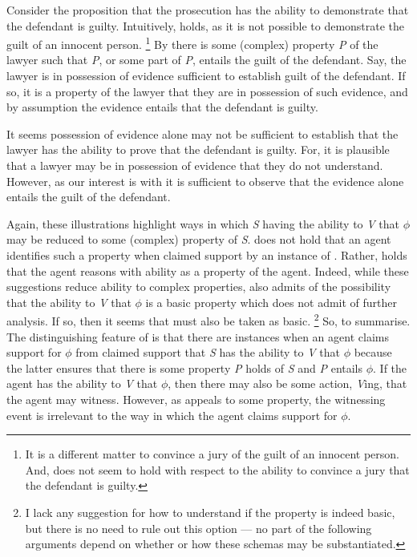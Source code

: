 \begin{note}
  \begin{illustration}
    Consider the proposition that the prosecution has the ability to demonstrate that the defendant is guilty.
    Intuitively,  holds, as it is not possible to demonstrate the guilt of an innocent person.\nolinebreak
    \footnote{
      It is a different matter to convince a jury of the guilt of an innocent person.
      And,  does not seem to hold with respect to the ability to convince a jury that the defendant is guilty.
    }
    By \AR{} there is some (complex) property \emph{P} of the lawyer such that \emph{P}, or some part of \emph{P}, entails the guilt of the defendant.
    Say, the lawyer is in possession of evidence sufficient to establish guilt of the defendant.
    If so, it is a property of the lawyer that they are in possession of such evidence, and by assumption the evidence entails that the defendant is guilty.

    It seems possession of evidence alone may not be sufficient to establish that the lawyer has the ability to prove that the defendant is guilty.
    For, it is plausible that a lawyer may be in possession of evidence that they do not understand.
    However, as our interest is with  it is sufficient to observe that the evidence alone entails the guilt of the defendant.
  \end{illustration}

  Again, these illustrations highlight ways in which \emph{S} having the ability to \emph{V} that \(\phi\) may be reduced to some (complex) property of \emph{S}.
  \AR{} does not hold that an agent identifies such a property when claimed support by an instance of .
  Rather, \AR{} holds that the agent reasons with ability as a property of the agent.
  Indeed, while these suggestions reduce ability to complex properties, \AR{} also admits of the possibility that the ability to \emph{V} that \(\phi\) is a basic property which does not admit of further analysis.
  If so, then it seems that  must also be taken as basic.\nolinebreak
  \footnote{
    I lack any suggestion for how to understand \AR{} if the property is indeed basic, but there is no need to rule out this option ---  no part of the following arguments depend on whether or how these schemas may be substantiated.
  }
  So, to summarise.
  The distinguishing feature of \AR{} is that there are instances when an agent claims support for \(\phi\) from claimed support that \emph{S} has the ability to \emph{V} that \(\phi\) because the latter ensures that there is some property \emph{P} holds of \emph{S} and \emph{P} entails \(\phi\).
  If the agent has the ability to \emph{V} that \(\phi\), then there may also be some action, \emph{V}ing, that the agent may witness.
  However, as \AR{} appeals to some property, the witnessing event is irrelevant to the way in which the agent claims support for \(\phi\).
\end{note}

